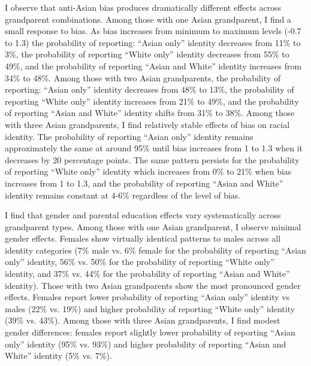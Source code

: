 I observe that anti-Asian bias produces dramatically different effects across grandparent combinations. Among those with one Asian grandparent, I find a small response to bias. As bias increases from minimum to maximum levels (-0.7 to 1.3) the probability of reporting: ``Asian only'' identity decreases from 11\% to 3\%, the probability of reporting ``White only'' identity decreases from 55\% to 49\%, and the probability of reporting ``Asian and White'' identity increases from 34\% to 48\%. Among those with two Asian grandparents, the probability of reporting: ``Asian only'' identity decreases from 48\% to 13\%, the probability of reporting ``White only'' identity increases from 21\% to 49\%, and the probability of reporting ``Asian and White'' identity shifts from 31\% to 38\%. Among those with three Asian grandparents, I find relatively stable effects of bias on racial identity. The probability of reporting ``Asian only'' identity remains approximately the same at around 95\% until bias increases from 1 to 1.3 when it decreases by 20 percentage points. The same pattern persists for the probability of reporting ``White only'' identity which increases from 0\% to 21\% when bias increases from 1 to 1.3, and the probability of reporting ``Asian and White'' identity remains constant at 4-6\% regardless of the level of bias.

I find that gender and parental education effects vary systematically across grandparent types. Among those with one Asian grandparent, I observe minimal gender effects. Females show virtually identical patterns to males across all identity categories (7\% male vs. 6\% female for the probability of reporting ``Asian only'' identity, 56\% vs. 50\% for the probability of reporting ``White only'' identity, and 37\% vs. 44\% for the probability of reporting ``Asian and White'' identity). Those with two Asian grandparents show the most pronounced gender effects. Females report lower probability of reporting ``Asian only'' identity vs males (22\% vs. 19\%) and higher probability of reporting ``White only'' identity (39\% vs. 43\%). Among those with three Asian grandparents, I find modest gender differences: females report slightly lower probability of reporting ``Asian only'' identity (95\% vs. 93\%) and higher probability of reporting ``Asian and White'' identity (5\% vs. 7\%). 

